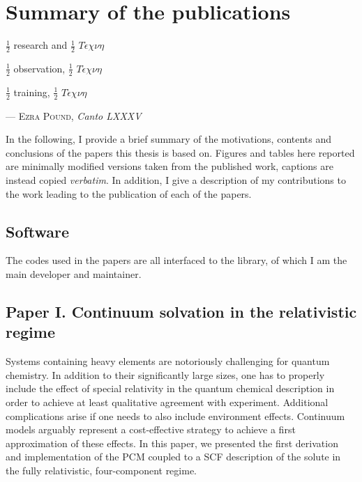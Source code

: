 \chapter{Summary of the publications}\label{ch:publications-summary}

\epigraph{$\frac{1}{2}$ research and $\frac{1}{2}\,\,T\acute{\epsilon}\chi\nu\eta$

          $\frac{1}{2}$ observation, $\frac{1}{2}\,\,T\acute{\epsilon}\chi\nu\eta$

          $\frac{1}{2}$ training, $\frac{1}{2}\,\,T\acute{\epsilon}\chi\nu\eta$}{
  --- \textsc{Ezra Pound}, \textit{Canto LXXXV}}

In the following, I provide a brief summary of the motivations, contents and
conclusions of the papers this thesis is based on.
Figures and tables here reported are minimally modified versions taken from the published work,
captions are instead copied \emph{verbatim}.
In addition, I give a description of my contributions to the work leading to
the publication of each of the papers.

\section*{Software}

The codes used in the papers are all interfaced to the \pcmsolver library,
of which I am the main developer and maintainer.

\section*{Paper I. Continuum solvation in the relativistic regime}

Systems containing heavy elements are notoriously challenging for quantum chemistry.
In addition to their significantly large sizes, one has to properly include the
effect of special relativity in the quantum chemical description in order to
achieve at least qualitative agreement with experiment.
Additional complications arise if one needs to also include environment effects.
Continuum models arguably represent a cost-effective strategy to achieve a first
approximation of these effects.
In this paper, we presented the first derivation and implementation of the \acs{PCM}
coupled to a \acs{SCF} description of the solute in the fully relativistic, four-component
regime.

